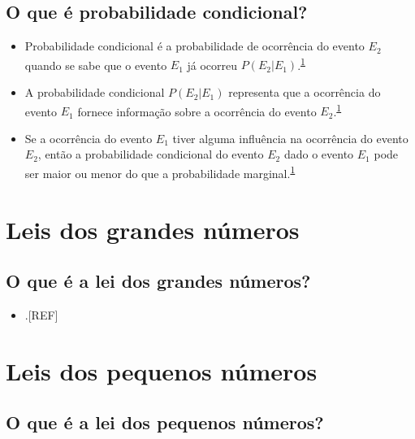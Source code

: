 \documentclass[
  a4paper,
]{book}
\providecommand{\tightlist}{%
  \setlength{\itemsep}{0pt}\setlength{\parskip}{0pt}}
\begin{document}
\hypertarget{o-que-uxe9-probabilidade-condicional}{%
\subsection{O que é probabilidade condicional?}\label{o-que-uxe9-probabilidade-condicional}}

\begin{itemize}
\item
  Probabilidade condicional é a probabilidade de ocorrência do evento \(E_{2}\) quando se sabe que o evento \(E_{1}\) já ocorreu \(P(E_{2} | E_{1})\).\textsuperscript{\protect\hyperlink{ref-grami2023}{1}}
\item
  A probabilidade condicional \(P(E_{2} | E_{1})\) representa que a ocorrência do evento \(E_{1}\) fornece informação sobre a ocorrência do evento \(E_{2}\).\textsuperscript{\protect\hyperlink{ref-grami2023}{1}}
\item
  Se a ocorrência do evento \(E_{1}\) tiver alguma influência na ocorrência do evento \(E_{2}\), então a probabilidade condicional do evento \(E_{2}\) dado o evento \(E_{1}\) pode ser maior ou menor do que a probabilidade marginal.\textsuperscript{\protect\hyperlink{ref-grami2023}{1}}
\end{itemize}

\hypertarget{lei-grandes-numeros}{%
\section{Leis dos grandes números}\label{lei-grandes-numeros}}

\hypertarget{o-que-uxe9-a-lei-dos-grandes-nuxfameros}{%
\subsection{O que é a lei dos grandes números?}\label{o-que-uxe9-a-lei-dos-grandes-nuxfameros}}

\begin{itemize}
\tightlist
\item
  .{[}REF{]}
\end{itemize}

\hypertarget{lei-pequenos-numeros}{%
\section{Leis dos pequenos números}\label{lei-pequenos-numeros}}

\hypertarget{o-que-uxe9-a-lei-dos-pequenos-nuxfameros}{%
\subsection{O que é a lei dos pequenos números?}\label{o-que-uxe9-a-lei-dos-pequenos-nuxfameros}}
\end{document}
